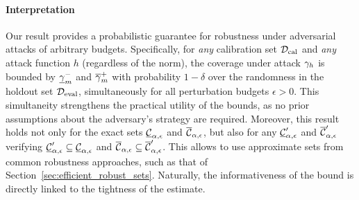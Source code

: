 \paragraph{Interpretation}
Our result provides a probabilistic guarantee for robustness under adversarial attacks of arbitrary budgets. Specifically, for \emph{any} calibration set $\mathcal{D}_\mathrm{cal}$ and \emph{any} attack function $h$ (regardless of the norm), the coverage under attack $\gamma_h$ is bounded by $\underline{\gamma}_{m}^{-}$ and $\overline{\gamma}_{m}^{+}$ with probability $1-\delta$ over the randomness in the holdout set $\mathcal{D}_\mathrm{eval}$, simultaneously for all perturbation budgets $\epsilon > 0$.
This simultaneity strengthens the practical utility of the bounds, as no prior assumptions about the adversary’s strategy are required.
Moreover, this result holds not only for the exact sets $\underline{\mathcal{C}}_{\alpha, \epsilon}$ and $\overline{\mathcal{C}}_{\alpha, \epsilon}$, but also for any  $\underline{\mathcal{C}}_{\alpha, \epsilon}^\prime$ and $\overline{\mathcal{C}}_{\alpha, \epsilon}^\prime$ verifying $\underline{\mathcal{C}}_{\alpha, \epsilon}^\prime \subseteq \underline{\mathcal{C}}_{\alpha, \epsilon}$ and $\overline{\mathcal{C}}_{\alpha, \epsilon} \subseteq \overline{\mathcal{C}}_{\alpha, \epsilon}^\prime$. This allows to use approximate sets from common robustness approaches, such as that of Section~\ref{sec:efficient_robust_sets}. Naturally, the informativeness of the bound is directly linked to the tightness of the estimate.